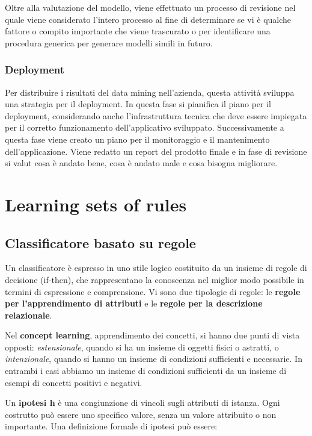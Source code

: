 \documentclass[a4paper]{extarticle}
\begin{document}
Oltre alla valutazione del modello, viene effettuato un processo di revisione nel quale viene considerato l'intero processo al fine di determinare se vi è qualche fattore o compito importante che viene trascurato o per identificare una procedura generica per generare modelli simili in futuro.

\subsubsection{Deployment}

Per distribuire i risultati del data mining nell'azienda, questa attività sviluppa una strategia per il deployment. In questa fase si pianifica il piano per il deployment, considerando anche l'infrastruttura tecnica che deve essere impiegata per il corretto funzionamento dell'applicativo sviluppato. Successivamente a questa fase viene creato un piano per il monitoraggio e il mantenimento dell'applicazione. Viene redatto un report del prodotto finale e in fase di revisione si valut cosa è andato bene, cosa è andato male e cosa bisogna migliorare.

\newpage

\section{Learning sets of rules}

\subsection{Classificatore basato su regole}

Un classificatore è espresso in uno stile logico costituito da un insieme di regole di decisione (if-then), che rappresentano la conoscenza nel miglior modo possibile in termini di espressione e comprensione. Vi sono due tipologie di regole: le \textbf{regole per l'apprendimento di attributi} e le \textbf{regole per la descrizione relazionale}.

Nel \textbf{concept learning}, apprendimento dei concetti, si hanno due punti di vista opposti: \textit{estensionale}, quando si ha un insieme di oggetti fisici o astratti, o \textit{intenzionale}, quando si hanno un insieme di condizioni sufficienti e necessarie. In entrambi i casi abbiamo un insieme di condizioni sufficienti da un insieme di esempi di concetti positivi e negativi.

Un \textbf{ipotesi h} è una congiunzione di vincoli sugli attributi di istanza. Ogni costrutto può essere uno specifico valore, senza un valore attribuito o non importante. Una definizione formale di ipotesi può essere:
\end{document}
